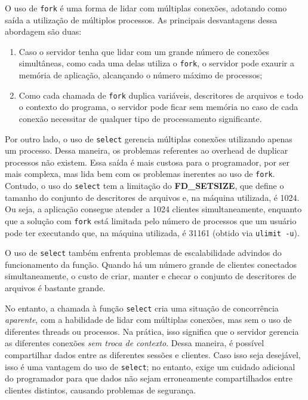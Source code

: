 \documentclass[a4paper,10pt]{article}
\begin{document}
O uso de {\tt fork} é uma forma de lidar com múltiplas conexões, adotando como saída a utilização de múltiplos processos. As principais desvantagens dessa abordagem são duas:
\begin{enumerate}
\item Caso o servidor tenha que lidar com um grande número de conexões simultâneas, como cada uma delas utiliza o {\tt fork}, o servidor pode exaurir a memória de aplicação, alcançando o número máximo de processos;
\item Como cada chamada de {\tt fork} duplica variáveis, descritores de arquivos e todo o contexto do programa, o servidor pode ficar sem memória no caso de cada conexão necessitar de qualquer tipo de processamento significante.
\end{enumerate}

Por outro lado, o uso de {\tt select} gerencia múltiplas conexões utilizando apenas um processo. Dessa maneira, os problemas referentes ao overhead de duplicar processos não existem. Essa saída é mais custosa para o programador, por ser mais complexa, mas lida bem com os problemas inerentes ao uso de {\tt fork}. Contudo, o uso do {\tt select} tem a limitação do \textbf{FD\_SETSIZE}, que define o tamanho do conjunto de descritores de arquivos e, na máquina utilizada, é 1024. Ou seja, a aplicação consegue atender a 1024 clientes simultaneamente, enquanto que a solução com {\tt fork} está limitada pelo número de processos que um usuário pode ter executando que, na máquina utilizada, é 31161 (obtido via {\tt ulimit -u}).

O uso de {\tt select} também enfrenta problemas de escalabilidade advindos do funcionamento da função. Quando há um número grande de clientes conectados simultaneamente, o custo de criar, manter e checar o conjunto de descritores de arquivos é bastante grande. 

No entanto, a chamada à função {\tt select} cria uma situação de concorrência \textit{aparente}, com a habilidade de lidar com múltiplas conexões, mas sem o uso de diferentes threads ou processos. Na prática, isso significa que o servidor gerencia as diferentes conexões \textit{sem troca de contexto}. Dessa maneira, é possível compartilhar dados entre as diferentes sessões e clientes. Caso isso seja desejável, isso é uma vantagem do uso de {\tt select}; no entanto, exige um cuidado adicional do programador para que dados não sejam erroneamente compartilhados entre clientes distintos, causando problemas de segurança.

\end{document}
